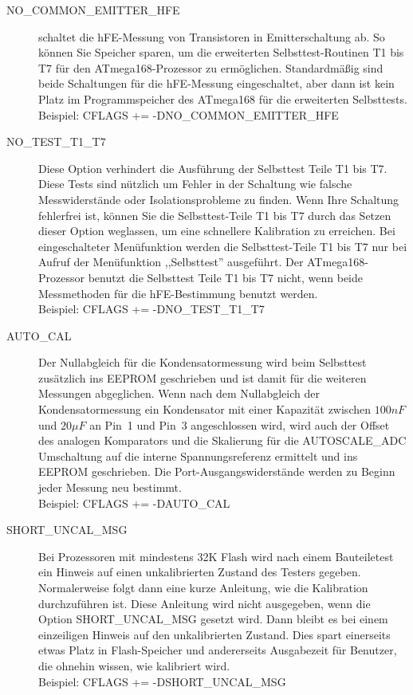\begin{description}
  \item[NO\_COMMON\_EMITTER\_HFE] schaltet die hFE-Messung von Transistoren in Emitterschaltung ab.
So können Sie Speicher sparen, um die erweiterten Selbsttest-Routinen T1 bis T7 für den ATmega168-Prozessor zu ermöglichen.
Standardmäßig sind beide Schaltungen für die hFE-Messung eingeschaltet,
aber dann ist kein Platz im Programmspeicher des ATmega168 für die erweiterten Selbsttests.\\
Beispiel: CFLAGS += -DNO\_COMMON\_EMITTER\_HFE

  \item[NO\_TEST\_T1\_T7] Diese Option verhindert die Ausführung der Selbsttest Teile T1 bis T7.
Diese Tests sind nützlich um Fehler in der Schaltung wie falsche Messwiderstände oder Isolationsprobleme zu finden.
Wenn Ihre Schaltung fehlerfrei ist, können Sie die Selbsttest-Teile T1 bis T7 durch das Setzen dieser Option weglassen, um eine
schnellere Kalibration zu erreichen.
Bei eingeschalteter Menüfunktion werden die Selbsttest-Teile T1 bis T7 nur bei Aufruf der Menüfunktion ,,Selbsttest'' ausgeführt.
Der ATmega168-Prozessor benutzt die Selbsttest Teile T1 bis T7 nicht, wenn beide Messmethoden für die hFE-Bestimmung benutzt werden.\\
Beispiel: CFLAGS += -DNO\_TEST\_T1\_T7

  \item[AUTO\_CAL] Der Nullabgleich für die Kondensatormessung wird beim
Selbsttest zusätzlich ins EEPROM geschrieben und ist damit für die weiteren Messungen abgeglichen.
Wenn nach dem Nullabgleich der Kondensatormessung ein Kondensator mit einer Kapazität zwischen \(100nF\) und \(20\mu F\) an Pin~1 und Pin~3 
angeschlossen wird, wird auch der Offset des analogen Komparators und die Skalierung für die AUTOSCALE\_ADC
Umschaltung auf die interne Spannungsreferenz ermittelt und ins EEPROM geschrieben.
Die Port-Ausgangswiderstände werden zu Beginn jeder Messung neu bestimmt. \\
Beispiel: CFLAGS += -DAUTO\_CAL

  \item[SHORT\_UNCAL\_MSG] Bei Prozessoren mit mindestens 32K Flash  wird nach einem Bauteiletest ein Hinweis auf einen unkalibrierten Zustand
des Testers gegeben. Normalerweise folgt dann eine kurze Anleitung, wie die Kalibration durchzuführen ist.
Diese Anleitung wird nicht ausgegeben, wenn die Option SHORT\_UNCAL\_MSG gesetzt wird.
Dann bleibt es bei einem einzeiligen Hinweis auf den unkalibrierten Zustand. 
Dies spart einerseits etwas Platz in Flash-Speicher und andererseits Ausgabezeit für Benutzer,
die ohnehin wissen, wie kalibriert wird.\\
Beispiel: CFLAGS += -DSHORT\_UNCAL\_MSG


\end{description}
